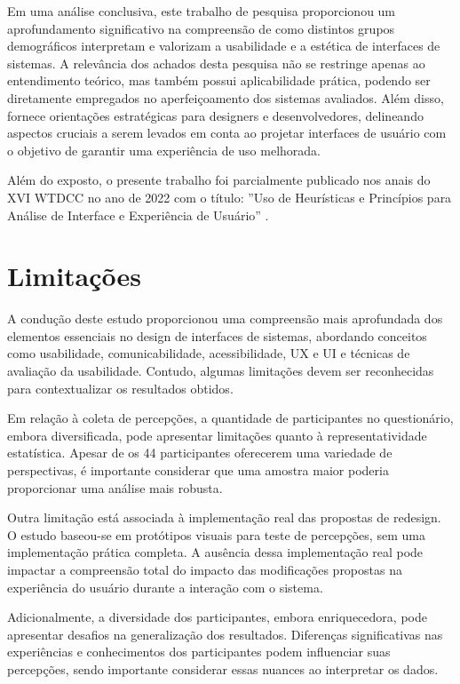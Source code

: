 Em uma análise conclusiva, este trabalho de pesquisa proporcionou um aprofundamento significativo na compreensão de como distintos grupos demográficos interpretam e valorizam a usabilidade e a estética de interfaces de sistemas. A relevância dos achados desta pesquisa não se restringe apenas ao entendimento teórico, mas também possui aplicabilidade prática, podendo ser diretamente empregados no aperfeiçoamento dos sistemas avaliados. Além disso, fornece orientações estratégicas para designers e desenvolvedores, delineando aspectos cruciais a serem levados em conta ao projetar interfaces de usuário com o objetivo de garantir uma experiência de uso melhorada.

Além do exposto, o presente trabalho foi parcialmente publicado nos anais do XVI \ac{WTDCC} no ano de 2022 com o título: ''Uso de Heurísticas e Princípios para Análise de Interface e Experiência de Usuário'' \cite{Zanetti2022}.

\section{Limitações}

A condução deste estudo proporcionou uma compreensão mais aprofundada dos elementos essenciais no design de interfaces de sistemas, abordando conceitos como usabilidade, comunicabilidade, acessibilidade, \ac{UX} e \ac{UI} e técnicas de avaliação da usabilidade. Contudo, algumas limitações devem ser reconhecidas para contextualizar os resultados obtidos.

Em relação à coleta de percepções, a quantidade de participantes no questionário, embora diversificada, pode apresentar limitações quanto à representatividade estatística. Apesar de os 44 participantes oferecerem uma variedade de perspectivas, é importante considerar que uma amostra maior poderia proporcionar uma análise  mais robusta.

Outra limitação está associada à implementação real das propostas de redesign. O estudo baseou-se em protótipos visuais para teste de percepções, sem uma implementação prática completa. A ausência dessa implementação real pode impactar a compreensão total do impacto das modificações propostas na experiência do usuário durante a interação com o sistema.

Adicionalmente, a diversidade dos participantes, embora enriquecedora, pode apresentar desafios na generalização dos resultados. Diferenças significativas nas experiências e conhecimentos dos participantes podem influenciar suas percepções, sendo importante considerar essas nuances ao interpretar os dados.

